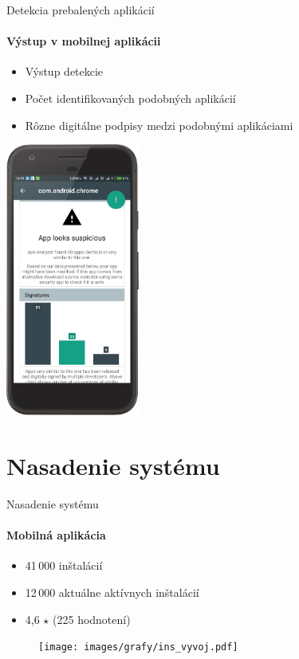 \documentclass{beamer}
\begin{document}
    \begin{frame}[label=lists]{Detekcia prebalených aplikácií}
 	 \framesubtitle{Výstup v mobilnej aplikácii}
	\begin{minipage}[htb]{\textwidth}
		\begin{minipage}[t]{0.5\textwidth}
			\hbox{}
			\hbox{}
			\hbox{}
			\begin{itemize}
				\item Výstup detekcie
				\item Počet identifikovaných podobných aplikácií
				\item Rôzne digitálne podpisy medzi podobnými aplikáciami
			\end{itemize}
     		\vfill
		\end{minipage}%
	\hfill
	\centering
		\begin{minipage}[t][][b]{0.4\textwidth}
		\centering
		\includegraphics[height=9cm]{images/app/detection_device_1.png}
		\label{fig:app-detail}
		\end{minipage}%
	\end{minipage}
  \end{frame}    
  
  \section{Nasadenie systému}  
  \begin{frame}[label=lists]{Nasadenie systému}
   	 \framesubtitle{Mobilná aplikácia}
  	\begin{itemize}
  		\item 41\,000 inštalácií
  		\item 12\,000 aktuálne aktívnych inštalácií
  		\item 4,6 $\star$ (225 hodnotení)
  	\end{itemize}
	\begin{figure}[htb]
	  	\begin{center}
    		\texttt{[image: images/grafy/ins\_vyvoj.pdf]}
  		\end{center}
	\end{figure}
  \end{frame}   
  
\end{document}
